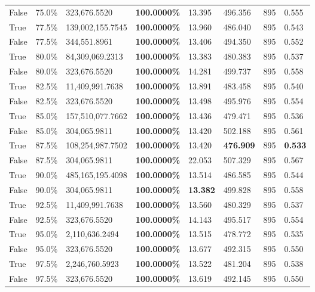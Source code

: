 \begin{table}[H]
\begin{tabular}{lllrllll}
\cline{1-8}
False & 75.0\% & 323,676.5520 & \bfseries \color{red} 100.0000\% & 13.395 & 496.356 & 895 & 0.555 \\
\cline{1-8}
True & 77.5\% & 139,002,155.7545 & \bfseries \color{red} 100.0000\% & 13.960 & 486.040 & 895 & 0.543 \\
\cline{1-8}
False & 77.5\% & 344,551.8961 & \bfseries \color{red} 100.0000\% & 13.406 & 494.350 & 895 & 0.552 \\
\cline{1-8}
True & 80.0\% & 84,309,069.2313 & \bfseries \color{red} 100.0000\% & 13.383 & 480.383 & 895 & 0.537 \\
\cline{1-8}
False & 80.0\% & 323,676.5520 & \bfseries \color{red} 100.0000\% & 14.281 & 499.737 & 895 & 0.558 \\
\cline{1-8}
True & 82.5\% & 11,409,991.7638 & \bfseries \color{red} 100.0000\% & 13.891 & 483.458 & 895 & 0.540 \\
\cline{1-8}
False & 82.5\% & 323,676.5520 & \bfseries \color{red} 100.0000\% & 13.498 & 495.976 & 895 & 0.554 \\
\cline{1-8}
True & 85.0\% & 157,510,077.7662 & \bfseries \color{red} 100.0000\% & 13.436 & 479.471 & 895 & 0.536 \\
\cline{1-8}
False & 85.0\% & \color{red} 304,065.9811 & \bfseries \color{red} 100.0000\% & 13.420 & 502.188 & 895 & 0.561 \\
\cline{1-8}
True & 87.5\% & 108,254,987.7502 & \bfseries \color{red} 100.0000\% & 13.420 & \bfseries \color{red} 476.909 & 895 & \bfseries \color{red} 0.533 \\
\cline{1-8}
False & 87.5\% & \color{red} 304,065.9811 & \bfseries \color{red} 100.0000\% & 22.053 & 507.329 & 895 & 0.567 \\
\cline{1-8}
True & 90.0\% & 485,165,195.4098 & \bfseries \color{red} 100.0000\% & 13.514 & 486.585 & 895 & 0.544 \\
\cline{1-8}
False & 90.0\% & \color{red} 304,065.9811 & \bfseries \color{red} 100.0000\% & \bfseries \color{red} 13.382 & 499.828 & 895 & 0.558 \\
\cline{1-8}
True & 92.5\% & 11,409,991.7638 & \bfseries \color{red} 100.0000\% & 13.560 & 480.329 & 895 & 0.537 \\
\cline{1-8}
False & 92.5\% & 323,676.5520 & \bfseries \color{red} 100.0000\% & 14.143 & 495.517 & 895 & 0.554 \\
\cline{1-8}
True & 95.0\% & 2,110,636.2494 & \bfseries \color{red} 100.0000\% & 13.515 & 478.772 & 895 & 0.535 \\
\cline{1-8}
False & 95.0\% & 323,676.5520 & \bfseries \color{red} 100.0000\% & 13.677 & 492.315 & 895 & 0.550 \\
\cline{1-8}
True & 97.5\% & 2,246,760.5923 & \bfseries \color{red} 100.0000\% & 13.522 & 481.204 & 895 & 0.538 \\
\cline{1-8}
False & 97.5\% & 323,676.5520 & \bfseries \color{red} 100.0000\% & 13.619 & 492.145 & 895 & 0.550 \\
\cline{1-8}
\bottomrule
\end{tabular}
\end{table}
